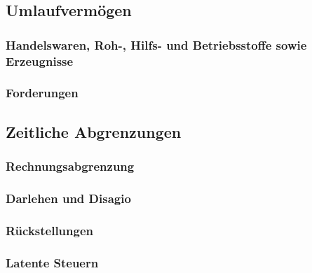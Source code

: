 \documentclass[paper=a4, fontsize=11pt]{scrartcl}
\numberwithin{equation}{section}
\numberwithin{figure}{section}
\numberwithin{table}{section}
\begin{document}

\subsection{Umlaufvermögen}


\subsubsection{Handelswaren, Roh-, Hilfs- und Betriebsstoffe sowie Erzeugnisse}


\subsubsection{Forderungen}


\subsection{Zeitliche Abgrenzungen}


\subsubsection{Rechnungsabgrenzung}


\subsubsection{Darlehen und Disagio}


\subsubsection{Rückstellungen}


\subsubsection{Latente Steuern}
\end{document}
